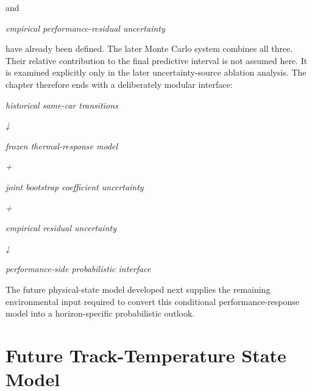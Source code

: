 and

\begin{center}\textit{empirical performance-residual uncertainty}\end{center}

have already been defined. The later Monte Carlo system combines all three. Their relative contribution to the final predictive interval is not assumed here. It is examined explicitly only in the later uncertainty-source ablation analysis. The chapter therefore ends with a deliberately modular interface:

\begin{center}\textit{historical same-car transitions}\end{center}

\begin{center}\textit{↓}\end{center}

\begin{center}\textit{frozen thermal-response model}\end{center}

\begin{center}\textit{+}\end{center}

\begin{center}\textit{joint bootstrap coefficient uncertainty}\end{center}

\begin{center}\textit{+}\end{center}

\begin{center}\textit{empirical residual uncertainty}\end{center}

\begin{center}\textit{↓}\end{center}

\begin{center}\textit{performance-side probabilistic interface}\end{center}

The future physical-state model developed next supplies the remaining environmental input required to convert this conditional performance-response model into a horizon-specific probabilistic outlook.

\section{Future Track-Temperature State Model}


